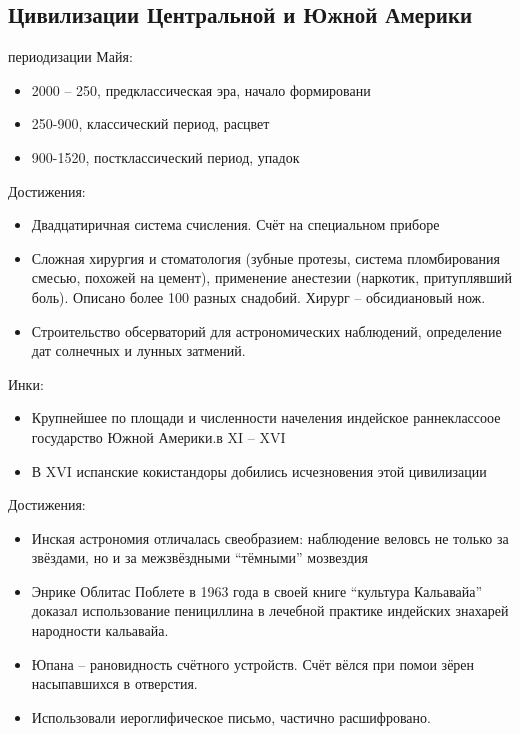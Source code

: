 \documentclass{book}
\theoremstyle{definition}
\begin{document}
    \subsection{Цивилизации Центральной и Южной Америки}

    периодизации Майя:
    \begin{itemize}
        \item  2000 -- 250, предклассическая эра, начало формировани
        \item 250-900, классический период, расцвет
        \item 900-1520, постклассический период, упадок
    \end{itemize}

    Достижения:
    \begin{itemize}
        \item  Двадцатиричная система счисления. Счёт на специальном приборе
        \item Сложная хирургия и стоматология (зубные протезы, система пломбирования смесью, похожей на цемент), применение анестезии (наркотик, притуплявший боль). Описано более 100 разных снадобий. Хирург -- обсидиановый нож.
        \item Строительство обсерваторий для астрономических наблюдений, определение дат солнечных и лунных затмений.
    \end{itemize}

    Инки:
    \begin{itemize}
        \item Крупнейшее по площади и численности начеления индейское раннеклассоое государство Южной Америки.в XI -- XVI
        \item В XVI испанские кокистандоры добились исчезновения этой цивилизации
    \end{itemize}

    Достижения:
    \begin{itemize}
        \item Инская астрономия отличалась свеобразием: наблюдение веловсь не только за звёздами, но и за межзвёздными ``тёмными'' мозвездия
        \item Энрике Облитас Поблете в 1963 года в своей книге ``культура Кальавайа'' доказал использование пенициллина в лечебной практике индейских знахарей народности кальавайа.
        \item Юпана -- рановидность счётного устройств. Счёт вёлся при помои зёрен насыпавшихся в отверстия.
        \item Использовали иероглифическое письмо, частично расшифровано.
    \end{itemize}
\end{document}
